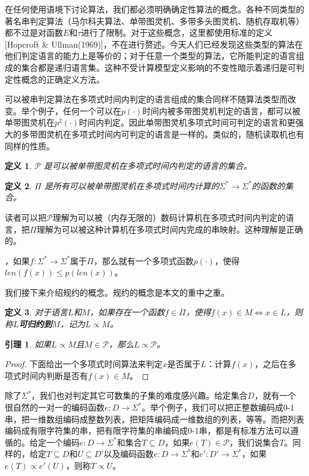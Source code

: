 \documentclass[twocolumn]{article}
\newtheorem{definition}{\hspace{2em}定义}
\newtheorem{lemma}{\hspace{2em}引理}
\theoremstyle{nonumberplain}%
\newtheorem{proof}{\hspace{2em}证明}
\begin{document}
\begin{CJK}{UTF8}{gbsn}
    在任何使用语境下讨论算法，我们都必须明确确定性算法的概念。各种不同类型的著名串判定算法（马尔科夫算法、单带图灵机、多带多头图灵机、随机存取机等）都不过是对函数$E$和$\tau$进行了限制。对于这些概念，这里都使用标准的定义[Hopcroft \& Ullman(1969)]，不在进行赘述。今天人们已经发现这些类型的算法在他们判定语言的能力上是等价的；对于任意一个类型的算法，它所能判定的语言组成的集合都是递归语言集。这种不受计算模型定义影响的不变性暗示着递归是可判定性概念的正确定义方法。

    可以被串判定算法在多项式时间内判定的语言组成的集合同样不随算法类型而改变。举个例子，任何一个可以在$p(\cdot)$时间内被多带图灵机判定的语言，都可以被单带图灵机在$p^2(\cdot)$时间内判定。因此单带图灵机多项式时间可判定的语言和更强大的多带图灵机在多项式时间内可判定的语言是一样的。类似的，随机读取机也有同样的性质。
    \begin{definition}
        $\mathcal{P}$ 是可以被单带图灵机在多项式时间内判定的语言的集合。
    \end{definition}
    \begin{definition}
        $\Pi$ 是所有可以被单带图灵机在多项式时间内计算的$\Sigma^*\to\Sigma^*$的函数的集合。
    \end{definition}

    读者可以把$\mathcal{P}$理解为可以被（内存无限的）数码计算机在多项式时间内判定的语言，把$\Pi$理解为可以被这种计算机在多项式时间内完成的串映射。这种理解是正确的。

    {}，如果$f:\Sigma^*\to\Sigma^*$属于$\Pi$，那么就有一个多项式函数$p(\cdot)$，使得$len(f(x))\le p(len(x))$。

    我们接下来介绍规约的概念。规约的概念是本文的重中之重。
    \begin{definition}
        对于语言$L$和$M$，如果存在一个函数$f\in\Pi$，使得$f(x)\in M \Leftrightarrow x\in L$，则称$L${\bf 可归约到}$M$，记为$L\propto M$。
    \end{definition}

    \begin{lemma}
        如果$L\propto M$且$M \in \mathcal{P}$，那么$L\propto\mathcal{P}$。
    \end{lemma}
    \begin{proof}
        下面给出一个多项式时间算法来判定$x$是否属于$L$：计算$f(x)$，之后在多项式时间内判断是否有$f(x)\in M$。
    \end{proof}

    除了$\Sigma^*$，我们也对判定其它可数集的子集的难度感兴趣。给定集合$D$，就有一个很自然的一对一的编码函数$e:D\to\Sigma^*$。举个例子，我们可以把正整数编码成0-1串，把一维数组编码成整数列表，把矩阵编码成一维数组的列表，等等。而把列表编码成有限字符集的串，把有限字符集的串编码成0-1串，都是有标准方法可以遵循的。给定一个编码$e:D\to\Sigma^*$和集合$T\subseteq D$，如果$e(T)\in\mathcal{P}$，我们说集合$T${}。同样的，给定$T\subseteq D$和$U\subseteq D'$以及编码函数$e:D\to\Sigma^*$和$e':D'\to\Sigma^*$，如果$e(T)\propto e'(U)$，则称$T\propto U$。


\end{CJK}
\end{document}
